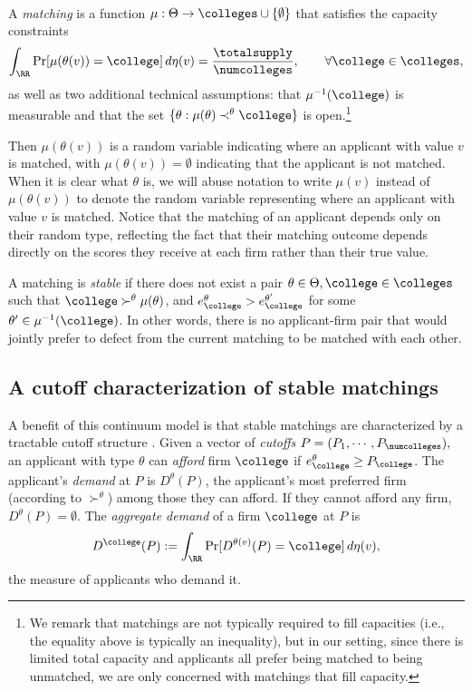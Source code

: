 \documentclass[10pt]{article}
\begin{document}
\begin{ReviewVerbatim}
\paragraph{}
A \textit{matching} is a function $\mu: \Theta \rightarrow \colleges\cup \{\emptyset\}$ that satisfies the capacity constraints
\begin{equation}
    \int_\RR \Pr[\mu(\theta(v)) = \college]\,d\eta(v) = \frac{\totalsupply}{\numcolleges},\qquad \forall \college\in \colleges,
\end{equation}
as well as two additional technical assumptions: that $\mu^{-1}(\college)$ is measurable and that the set $\{\theta:\mu(\theta)\prec^\theta \college\}$ is open.\footnote{We remark that matchings are not typically required to fill capacities (i.e., the equality above is typically an inequality), but in our setting, since there is limited total capacity and applicants all prefer being matched to being unmatched, we are only concerned with matchings that fill capacity.}

Then $\mu(\theta(v))$ is a random variable indicating where an applicant with value $v$ is matched, with $\mu(\theta(v)) = \emptyset$ indicating that the applicant is not matched. When it is clear what $\theta$ is, we will abuse notation to write $\mu(v)$ instead of $\mu(\theta(v))$ to denote the random variable representing where an applicant with value $v$ is matched. Notice that the matching of an applicant depends only on their random type, reflecting the fact that their matching outcome depends directly on the scores they receive at each firm rather than their true value.

A matching is \textit{stable} if there does not exist a pair $\theta\in \Theta, \college\in \colleges$ such that $\college\succ^\theta \mu(\theta)$, and $e^\theta_\college > e^{\theta'}_{\college}$ for some $\theta'\in \mu^{-1}(\college)$. In other words, there is no applicant-firm pair that would jointly prefer to defect from the current matching to be matched with each other.

\subsection{A cutoff characterization of stable matchings}
A benefit of this continuum model is that stable matchings are characterized by a tractable cutoff structure \citep{azevedo2016supply}. Given a vector of \textit{cutoffs} $P = (P_1, \cdots, P_\numcolleges),$ an applicant with type $\theta$ can \textit{afford} firm $\college$ if $e^\theta_\college \ge P_\college$. The applicant's \textit{demand} at $P$ is $D^\theta(P)$, the applicant's most preferred firm (according to $\succ^\theta$) among those they can afford. If they cannot afford any firm, $D^\theta(P)=\emptyset$.
The \textit{aggregate demand} of a firm $\college$ at $P$ is
\begin{equation}
    D^\college(P) := \int_\RR \Pr[D^{\theta(v)}(P) = \college]\,d\eta(v),
\end{equation}
the measure of applicants who demand it.


\end{ReviewVerbatim}
\end{document}
